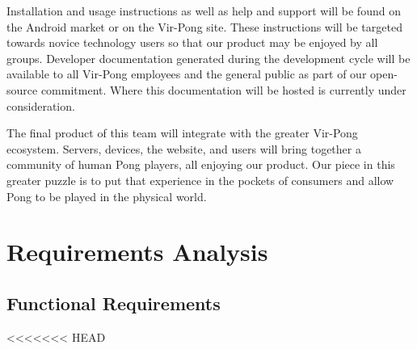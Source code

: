 \documentclass[12pt]{article}
\begin{document}
Installation and usage instructions as well as help and support will be found on the Android market or on the Vir-Pong site.  These instructions will be targeted towards novice technology users so that our product may be enjoyed by all groups.  Developer documentation generated during the development cycle will be available to all Vir-Pong employees and the general public as part of our open-source commitment.  Where this documentation will be hosted is currently under consideration.  

The final product of this team will integrate with the greater Vir-Pong ecosystem.  Servers, devices, the website, and users will bring together a community of human Pong players, all enjoying our product.  Our piece in this greater puzzle is to put that experience in the pockets of consumers and allow Pong to be played in the physical world.


\section{Requirements Analysis}
\subsection{Functional Requirements}

\singlespacing
<<<<<<< HEAD
\end{document}
